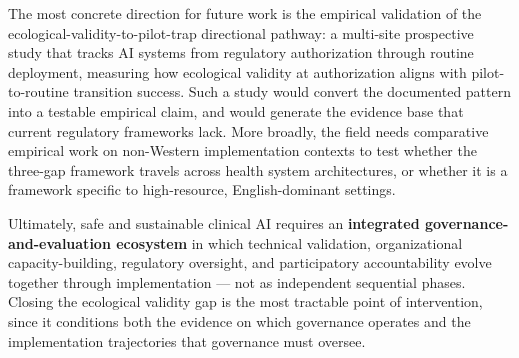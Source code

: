 The most concrete direction for future work is the empirical validation
of the ecological-validity-to-pilot-trap directional pathway: a multi-site
prospective study that tracks AI systems from regulatory authorization
through routine deployment, measuring how ecological validity at
authorization aligns with pilot-to-routine transition success. Such a
study would convert the documented pattern into a testable empirical
claim, and
would generate the evidence base that current regulatory frameworks
lack. More broadly, the field needs comparative empirical work on
non-Western implementation contexts to test whether the three-gap
framework travels across health system architectures, or whether it is
a framework specific to high-resource, English-dominant settings.

Ultimately, safe and sustainable clinical AI requires an
\textbf{integrated governance-and-evaluation ecosystem} in which technical
validation, organizational capacity-building, regulatory oversight, and
participatory accountability evolve together through implementation ---
not as independent sequential phases. Closing the ecological validity
gap is the most tractable point of intervention, since it conditions
both the evidence on which governance operates and the implementation
trajectories that governance must oversee.
